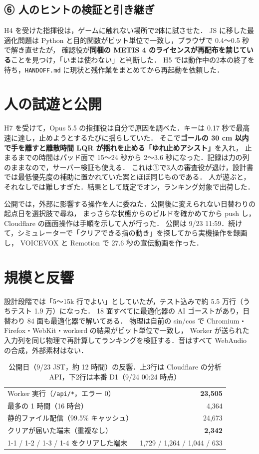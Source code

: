 \documentclass[a4paper,twocolumn,10pt]{ltjsarticle}
\newcommand{\code}[1]{\texttt{#1}}
\begin{document}
\subsection{⑥ 人のヒントの検証と引き継ぎ}
H4 を受けた指揮役は，ゲームに触れない場所で2体に試させた．
JS に移した最適化問題は Python と目的関数がビット単位で一致し，ブラウザで 0.4〜0.5 秒で解き直せたが，
確認役が\textbf{同梱の METIS 4 のライセンスが再配布を禁じている}ことを見つけ，「いまは使わない」と判断した．
H5 では動作中の2本の終了を待ち，\code{HANDOFF.md} に現状と残作業をまとめてから再起動を依頼した．

\section{人の試遊と公開}
H7 を受けて，Opus 5.5 の指揮役は自分で原因を調べた．キーは 0.17 秒で最高速に達し，止めようとするたびに揺らしていた．
そこで\textbf{ゴールの 30 cm 以内で手を離すと離散時間 LQR が揺れを止める「ゆれ止めアシスト」}を入れ，
止まるまでの時間はパッド面で 15〜24 秒から 2〜3.6 秒になった．記録は力の列のままなので，サーバー検証も使える．
これは①で3人の審査役が退け，設計書では最低優先度の補助に置かれていた案とほぼ同じものである．
人が遊ぶと，それなしでは難しすぎた．結果として既定でオン，ランキング対象で出荷した．

公開では，外部に影響する操作を人に委ねた．公開後に変えられない日替わりの起点日を選択肢で尋ね，
まっさらな状態からのビルドを確かめてから push し，Cloudflare の画面操作は手順を示して人が行った．
公開は 9/23 11:59．続けて，シミュレーターで「クリアできる指の動き」を探してから実機操作を録画し，
VOICEVOX と Remotion で 27.6 秒の宣伝動画を作った．

\section{規模と反響}
設計段階では「5〜15k 行でよい」としていたが，テスト込みで約 5.5 万行（うちテスト 1.9 万）になった．
18 面すべてに最適化器の AI ゴーストがあり，日替わり 84 面も最適化器で解いてある．
物理は自前の sin/cos で Chromium・Firefox・WebKit・workerd の結果がビット単位で一致し，
Worker が送られた入力列を同じ物理で再計算してランキングを検証する．音はすべて WebAudio の合成，外部素材はない．

\begin{table}[t]
\centering
\caption{公開日（9/23 JST，約 12 時間）の反響．上3行は Cloudflare の分析 API，下2行は本番 D1（9/24 00:24 時点）}
\label{tab:reception}
\footnotesize
\begin{tabular}{@{}lr@{}}
\toprule
Worker 実行（\code{/api/*}，エラー 0） & \textbf{23,505} \\
\quad 最多の 1 時間（16 時台） & 4,364 \\
静的ファイル配信（99.5\% キャッシュ） & 24,673 \\
クリアが届いた端末（重複なし） & \textbf{2,342} \\
1-1 / 1-2 / 1-3 / 1-4 をクリアした端末 & 1,729 / 1,264 / 1,044 / 633 \\
\bottomrule
\end{tabular}
\end{table}
\end{document}
